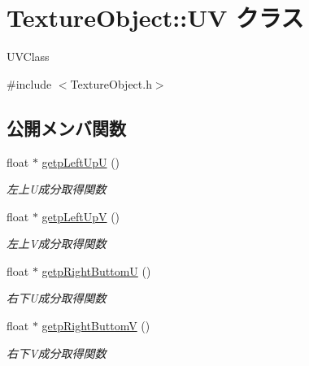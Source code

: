 \hypertarget{class_texture_object_1_1_u_v}{}\section{Texture\+Object\+:\+:UV クラス}
\label{class_texture_object_1_1_u_v}


U\+V\+Class  




{\ttfamily \#include $<$Texture\+Object.\+h$>$}

\subsection*{公開メンバ関数}
\begin{DoxyCompactItemize}
\item 
float $\ast$ \mbox{\hyperlink{class_texture_object_1_1_u_v_aba8a4353d85b8e17896c2b477d0bef0b}{getp\+Left\+UpU}} ()
\begin{DoxyCompactList}\small\item\em 左上\+U成分取得関数 \end{DoxyCompactList}\item 
float $\ast$ \mbox{\hyperlink{class_texture_object_1_1_u_v_a78e627051e90d91ee6f28abb22d00f5a}{getp\+Left\+UpV}} ()
\begin{DoxyCompactList}\small\item\em 左上\+V成分取得関数 \end{DoxyCompactList}\item 
float $\ast$ \mbox{\hyperlink{class_texture_object_1_1_u_v_a3e99bc0b056f17288f5aee1a3b81b60a}{getp\+Right\+ButtomU}} ()
\begin{DoxyCompactList}\small\item\em 右下\+U成分取得関数 \end{DoxyCompactList}\item 
float $\ast$ \mbox{\hyperlink{class_texture_object_1_1_u_v_aec258407da09ac45c626be3ba1b33103}{getp\+Right\+ButtomV}} ()
\begin{DoxyCompactList}\small\item\em 右下\+V成分取得関数 \end{DoxyCompactList}\end{DoxyCompactItemize}
